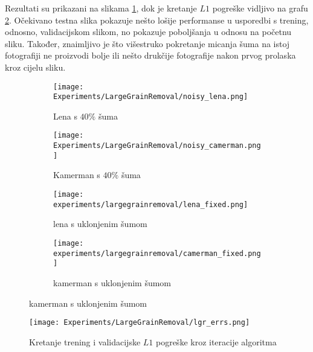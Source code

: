 Rezultati su prikazani na slikama \ref{fig:large_sp_result_grid}, dok je kretanje $L1$ pogreške vidljivo na grafu \ref{graph:large_sp_train_val_loss}.
Očekivano testna slika pokazuje nešto lošije performanse u usporedbi s trening, odnosno, validacijskom slikom, no pokazuje poboljšanja u odnosu na početnu sliku.
Također, znaimljivo je što višestruko pokretanje micanja šuma na istoj fotografiji ne proizvodi bolje ili nešto drukčije fotografije nakon prvog prolaska kroz cijelu sliku.

\begin{figure}
	\centering
	\caption{Fotografije lene i fotografa prije i poslije micanja šuma koji prekriva $40\%$ slike}
	\begin{subfigure}[t]{0.35\textwidth}
		\texttt{[image: Experiments/LargeGrainRemoval/noisy\_lena.png]}
		\caption{Lena s $40\%$ šuma}
	\end{subfigure}
	\begin{subfigure}[t]{0.35\textwidth}
		\texttt{[image: Experiments/LargeGrainRemoval/noisy\_camerman.png]}
		\caption{Kamerman s $40\%$ šuma}
	\end{subfigure}
	\begin{subfigure}[t]{0.35\textwidth}
		\texttt{[image: experiments/largegrainremoval/lena\_fixed.png]}
		\caption{lena s uklonjenim šumom}
	\end{subfigure}
	\begin{subfigure}[t]{0.35\textwidth}
		\texttt{[image: experiments/largegrainremoval/camerman\_fixed.png]}
		\caption{kamerman s uklonjenim šumom}
	\end{subfigure}
	\label{fig:large_sp_result_grid}
\end{figure}

\begin{figure}
	\centering
	\texttt{[image: Experiments/LargeGrainRemoval/lgr\_errs.png]}
	\caption{Kretanje trening i validacijske $L1$ pogreške kroz iteracije algoritma}
	\label{graph:large_sp_train_val_loss}
\end{figure}
